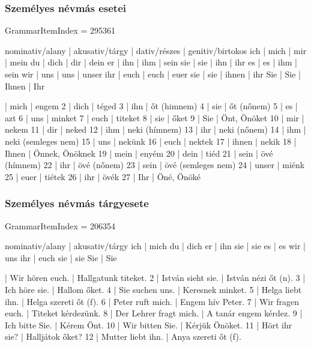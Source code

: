 \documentclass{article}
\newenvironment{desc}{\verbatim}{\endverbatim}
\newenvironment{exmp}{\verbatim}{\endverbatim}
\begin{document}
\subsubsection{Személyes névmás esetei}

GrammarItemIndex = 295361

\begin{desc}
nominativ/alany | akusativ/tárgy | dativ/részes | genitiv/birtokos
ich             | mich           | mir          | mein
du              | dich           | dir          | dein 
er              | ihn            | ihm          | sein
sie             | sie            | ihn          | ihr
es              | es             | ihm          | sein
wir             | uns            | uns          | unser
ihr             | euch           | euch         | euer
sie             | sie            | ihnen        | ihr
Sie             | Sie            | Ihnen        | Ihr 
\end{desc}

\begin{exmp}
1 | mich | engem
2 | dich | téged
3 | ihn | őt (himnem)
4 | sie | őt (nőnem)
5 | es | azt
6 | uns | minket
7 | euch | titeket
8 | sie | őket
9 | Sie | Önt, Önöket
10 | mir | nekem
11 | dir | neked
12 | ihm | neki (hímnem)
13 | ihr | neki (nőnem)
14 | ihm | neki (semleges nem)
15 | uns | nekünk
16 | euch | nektek
17 | ihnen | nekik
18 | Ihnen | Önnek, Önöknek
19 | mein | enyém
20 | dein | tiéd
21 | sein | övé (hímnem)
22 | ihr | övé (nőnem)
23 | sein | övé (semleges nem)
24 | unser | miénk
25 | euer | tiétek
26 | ihr | övék
27 | Ihr | Öné, Önöké
\end{exmp}

\subsubsection{Személyes névmás tárgyesete}

GrammarItemIndex = 206354

\begin{desc}
nominativ/alany | akusativ/tárgy
ich             | mich
du              | dich
er              | ihn
sie             | sie
es              | es
wir             | uns
ihr             | euch
sie             | sie
Sie             | Sie
\end{desc}

\begin{exmp}
1 | Wir hören euch. | Hallgatunk titeket.
2 | István sieht sie. | István nézi őt (n).
3 | Ich höre sie. | Hallom őket.
4 | Sie suchen uns. | Keresnek minket.
5 | Helga liebt ihn. | Helga szereti őt (f).
6 | Peter ruft mich. | Engem hív Peter.
7 | Wir fragen euch. | Titeket kérdezünk.
8 | Der Lehrer fragt mich. | A tanár engem kérdez.
9 | Ich bitte Sie. | Kérem Önt.
10 | Wir bitten Sie. | Kérjük Önöket.
11 | Hört ihr sie? | Halljátok őket?
12 | Mutter liebt ihn. | Anya szereti őt (f).
\end{exmp}
\end{document}
